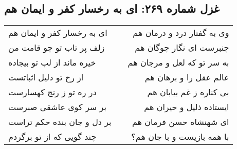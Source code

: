 \begin{center}
\section*{غزل شماره ۲۶۹: ای به رخسار کفر و ایمان هم}
\label{sec:269}
\begin{longtable}{l p{0.5cm} r}
ای به رخسار کفر و ایمان هم
&&
وی به گفتار درد و درمان هم
\\
زلف پر تاب تو چو قامت من
&&
چنبرست ای نگار چوگان هم
\\
خیره ماند از لب تو بیجاده
&&
به سر تو که لعل و مرجان هم
\\
از رخ تو دلیل اثباتست
&&
عالم عقل را و برهان هم
\\
در ره تو ز رنج کهسارست
&&
بی کناره ز غم بیابان هم
\\
بر سر کوی عاشقی صبرست
&&
ایستاده ذلیل و حیران هم
\\
بر دل و جان بنده حکم تراست
&&
ای شهنشاه حسن فرمان هم
\\
چند گویی که از تو برگردم
&&
با همه بازیست و با جان هم؟
\\
\end{longtable}
\end{center}
